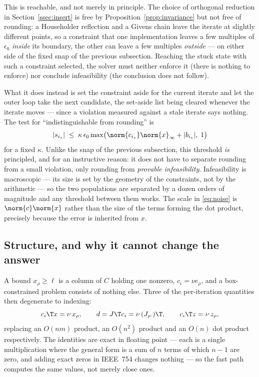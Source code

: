 This is reachable, and not merely in principle. The choice of orthogonal reduction
in Section~\ref{ssec:insert} is free by Proposition~\ref{prop:invariance} but not
free of rounding: a Householder reflection and a Givens chain leave the iterate at
slightly different points, so a constraint that one implementation leaves a few
multiples of $\epsilon_0$ \emph{inside} its boundary, the other can leave a few
multiples \emph{outside} --- on either side of the fixed snap of the previous
subsection. Reaching the stuck state with such a constraint selected, the solver
must neither enforce it (there is nothing to enforce) nor conclude infeasibility
(the conclusion does not follow).

What it does instead is set the constraint aside for the current iterate and let
the outer loop take the next candidate, the set-aside list being cleared whenever
the iterate moves --- since a violation measured against a stale iterate says
nothing. The test for ``indistinguishable from rounding'' is
\begin{equation}
  |s_{i_*}| \;\le\; \kappa\, \epsilon_0 \max\bigl(
    \norm{c_{i_*}} \norm{x}_\infty + |b_{i_*}|,\; 1 \bigr)
  \label{eq:noise}
\end{equation}
for a fixed $\kappa$. Unlike the snap of the previous subsection, this threshold
\emph{is} principled, and for an instructive reason: it does not have to separate
rounding from a small violation, only rounding from \emph{provable
infeasibility}. Infeasibility is macroscopic --- its size is set by the geometry of
the constraints, not by the arithmetic --- so the two populations are separated by
a dozen orders of magnitude and any threshold between them works. The scale in
\eqref{eq:noise} is $\norm{c}\norm{x}$ rather than the size of the terms forming
the dot product, precisely because the error is inherited from $x$.

\subsection{Structure, and why it cannot change the answer}

A bound $x_\rho \ge \ell$ is a column of $C$ holding one nonzero, $c_i = \nu
e_\rho$, and a box-constrained problem consists of nothing else. Three of the
per-iteration quantities then degenerate to indexing:
\begin{equation}
  c_i\T x = \nu\, x_\rho,
  \qquad
  d = J\T c_i = \nu\, (J_{\rho\cdot})\T,
  \qquad
  c_i\T z = \nu\, z_\rho ,
  \label{eq:unit}
\end{equation}
replacing an $O(nm)$ product, an $O(n^2)$ product and an $O(n)$ dot product
respectively. The identities are exact in floating point --- each is a single
multiplication where the general form is a sum of $n$ terms of which $n-1$ are
zero, and adding exact zeros in IEEE~754 changes nothing --- so the fast path
computes the same values, not merely close ones.

